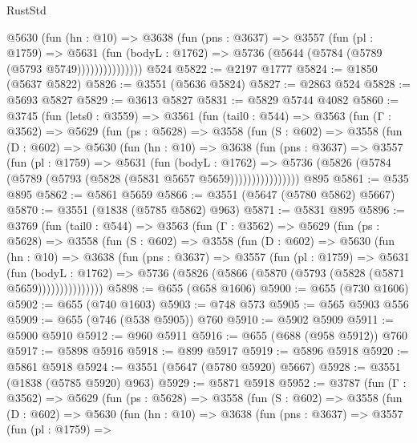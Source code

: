 \begin{lexlean}{RustStd}
\begin{coremodule}
                @5630
                  (fun (hn : @10) =>
                  @3638
                    (fun (pns : @3637) =>
                    @3557
                      (fun (pl : @1759) =>
                      @5631
                        (fun (bodyL : @1762) =>
                        @5736 (@5644 (@5784 (@5789 (@5793 @5749)))))))))))))))
    @524
@5822 := @2197 @1777
@5824 := @1850 (@5637 @5822)
@5826 := @3551 (@5636 @5824)
@5827 := @2863 @524
@5828 := @5693 @5827
@5829 := @3613 @5827
@5831 := @5829 @5744 @4082
@5860 := @3745
    (fun (lets0 : @3559) =>
    @3561
      (fun (tail0 : @544) =>
      @3563
        (fun (Γ : @3562) =>
        @5629
          (fun (ps : @5628) =>
          @3558
            (fun (S : @602) =>
            @3558
              (fun (D : @602) =>
              @5630
                (fun (hn : @10) =>
                @3638
                  (fun (pns : @3637) =>
                  @3557
                    (fun (pl : @1759) =>
                    @5631
                      (fun (bodyL : @1762) =>
                      @5736 (@5826 (@5784 (@5789 (@5793 (@5828 (@5831 @5657 @5659))))))))))))))))
    @895
@5861 := @535 @895
@5862 := @5861 @5659
@5866 := @3551 (@5647 (@5780 @5862) @5667)
@5870 := @3551 (@1838 (@5785 @5862) @963)
@5871 := @5831 @895
@5896 := @3769
    (fun (tail0 : @544) =>
    @3563
      (fun (Γ : @3562) =>
      @5629
        (fun (ps : @5628) =>
        @3558
          (fun (S : @602) =>
          @3558
            (fun (D : @602) =>
            @5630
              (fun (hn : @10) =>
              @3638
                (fun (pns : @3637) =>
                @3557
                  (fun (pl : @1759) =>
                  @5631
                    (fun (bodyL : @1762) =>
                    @5736 (@5826 (@5866 (@5870 (@5793 (@5828 (@5871 @5659)))))))))))))))
@5898 := @655 (@658 @1606)
@5900 := @655 (@730 @1606)
@5902 := @655 (@740 @1603)
@5903 := @748 @573
@5905 := @565 @5903 @556
@5909 := @655 (@746 (@538 @5905)) @760
@5910 := @5902 @5909
@5911 := @5900 @5910
@5912 := @960 @5911
@5916 := @655 (@688 (@958 @5912)) @760
@5917 := @5898 @5916
@5918 := @899 @5917
@5919 := @5896 @5918
@5920 := @5861 @5918
@5924 := @3551 (@5647 (@5780 @5920) @5667)
@5928 := @3551 (@1838 (@5785 @5920) @963)
@5929 := @5871 @5918
@5952 := @3787
    (fun (Γ : @3562) =>
    @5629
      (fun (ps : @5628) =>
      @3558
        (fun (S : @602) =>
        @3558
          (fun (D : @602) =>
          @5630
            (fun (hn : @10) =>
            @3638
              (fun (pns : @3637) =>
              @3557
                (fun (pl : @1759) =>

\end{coremodule}
\end{lexlean}
